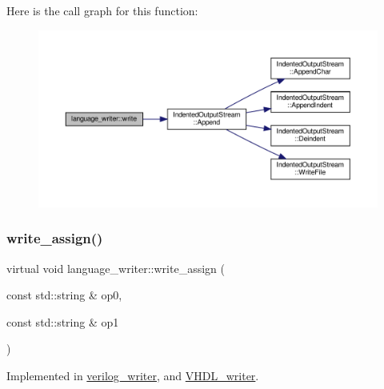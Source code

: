 Here is the call graph for this function\+:
\nopagebreak
\begin{figure}[H]
\begin{center}
\leavevmode
\includegraphics[width=350pt]{d6/d67/classlanguage__writer_a17a157a423c319a75b20ed1eb8bb6f6e_cgraph}
\end{center}
\end{figure}
\mbox{\label{classlanguage__writer_a49b971e9b90296b0096a78c06219992d}} 
\subsubsection{\texorpdfstring{write\+\_\+assign()}{write\_assign()}}
{\footnotesize\ttfamily virtual void language\+\_\+writer\+::write\+\_\+assign (\begin{DoxyParamCaption}\item[{const std\+::string \&}]{op0,  }\item[{const std\+::string \&}]{op1 }\end{DoxyParamCaption})\hspace{0.3cm}{\ttfamily [pure virtual]}}



Implemented in \hyperlink{classverilog__writer_a67bc3c89705a8863735409e64aa8cf32}{verilog\+\_\+writer}, and \hyperlink{structVHDL__writer_af48ed8414cfbd1a7713d3bab7b4b5218}{V\+H\+D\+L\+\_\+writer}.

\mbox{\label{classlanguage__writer_acb35eb2c22883fcf1f479a091dc4429d}} 
